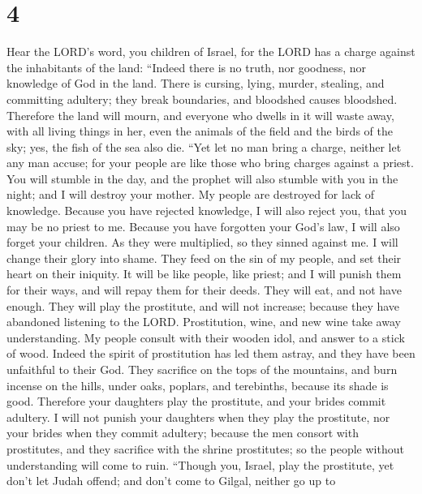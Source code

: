 \hypertarget{section-3}{%
\section{4}\label{section-3}}

 Hear the LORD's word, you children of Israel, for the LORD
has a charge against the inhabitants of the land: ``Indeed there is no
truth, nor goodness, nor knowledge of God in the land. 
There is cursing, lying, murder, stealing, and committing adultery; they
break boundaries, and bloodshed causes bloodshed.  Therefore
the land will mourn, and everyone who dwells in it will waste away, with
all living things in her, even the animals of the field and the birds of
the sky; yes, the fish of the sea also die.  ``Yet let no
man bring a charge, neither let any man accuse; for your people are like
those who bring charges against a priest.  You will stumble
in the day, and the prophet will also stumble with you in the night; and
I will destroy your mother.  My people are destroyed for
lack of knowledge. Because you have rejected knowledge, I will also
reject you, that you may be no priest to me. Because you have forgotten
your God's law, I will also forget your children.  As they
were multiplied, so they sinned against me. I will change their glory
into shame.  They feed on the sin of my people, and set
their heart on their iniquity.  It will be like people, like
priest; and I will punish them for their ways, and will repay them for
their deeds.  They will eat, and not have enough. They will
play the prostitute, and will not increase; because they have abandoned
listening to the LORD.  Prostitution, wine, and new wine
take away understanding.  My people consult with their
wooden idol, and answer to a stick of wood. Indeed the spirit of
prostitution has led them astray, and they have been unfaithful to their
God.  They sacrifice on the tops of the mountains, and burn
incense on the hills, under oaks, poplars, and terebinths, because its
shade is good. Therefore your daughters play the prostitute, and your
brides commit adultery.  I will not punish your daughters
when they play the prostitute, nor your brides when they commit
adultery; because the men consort with prostitutes, and they sacrifice
with the shrine prostitutes; so the people without understanding will
come to ruin.  ``Though you, Israel, play the prostitute,
yet don't let Judah offend; and don't come to Gilgal, neither go up to
